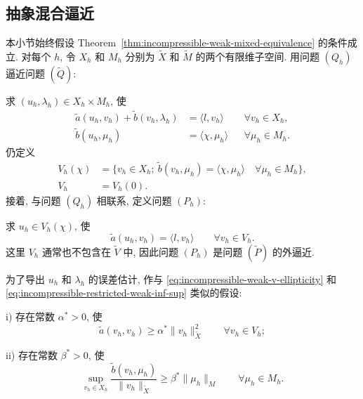 \subsection{抽象混合逼近}
\label{subsec:incompressible-abstract-mixed-discretization}

本小节始终假设 Theorem~\ref{thm:incompressible-weak-mixed-equivalence}
的条件成立.
对每个 $h$, 令 $X_h$ 和 $M_h$ 分别为
$\widetilde X$ 和 $\widetilde M$ 的两个有限维子空间.
用问题 $(Q_h)$ 逼近问题 $(\widetilde Q)$:

求 $(u_h,\lambda_h)\in X_h\times M_h$, 使
\begin{align}
\widetilde a(u_h,v_h)+\widetilde b(v_h,\lambda_h)
&=\langle l,v_h\rangle
&&\forall v_h\in X_h,
\label{eq:incompressible-discrete-q-first}\\
\widetilde b(u_h,\mu_h)
&=\langle\chi,\mu_h\rangle
&&\forall\mu_h\in M_h.
\label{eq:incompressible-discrete-q-second}
\end{align}
仍定义
\begin{equation}\label{eq:incompressible-discrete-affine-kernel}
\begin{aligned}
V_h(\chi)
&=\{v_h\in X_h;\
\widetilde b(v_h,\mu_h)=\langle\chi,\mu_h\rangle
\quad\forall\mu_h\in M_h\},\\
V_h&=V_h(0).
\end{aligned}
\end{equation}
接着, 与问题 $(Q_h)$ 相联系, 定义问题 $(P_h)$:

求 $u_h\in V_h(\chi)$, 使
\begin{equation}\label{eq:incompressible-discrete-p}
\widetilde a(u_h,v_h)=\langle l,v_h\rangle
\qquad\forall v_h\in V_h.
\end{equation}
这里 $V_h$ 通常也不包含在 $\widetilde V$ 中,
因此问题 $(P_h)$ 是问题 $(\widetilde P)$ 的外逼近.

为了导出 $u_h$ 和 $\lambda_h$ 的误差估计,
作与 \eqref{eq:incompressible-weak-v-ellipticity}
和 \eqref{eq:incompressible-restricted-weak-inf-sup} 类似的假设:

\textup{i)} 存在常数 $\alpha^*>0$, 使
\begin{equation}\label{eq:incompressible-discrete-vh-ellipticity}
\widetilde a(v_h,v_h)
\geq\alpha^*\|v_h\|_{\widetilde X}^2
\qquad\forall v_h\in V_h;
\end{equation}

\textup{ii)} 存在常数 $\beta^*>0$, 使
\begin{equation}\label{eq:incompressible-discrete-inf-sup}
\sup_{v_h\in X_h}
\frac{\widetilde b(v_h,\mu_h)}
{\|v_h\|_{\widetilde X}}
\geq\beta^*\|\mu_h\|_M
\qquad\forall\mu_h\in M_h.
\end{equation}

